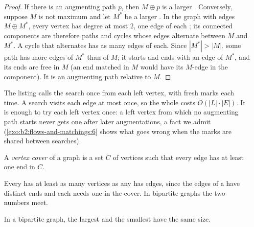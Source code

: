 \begin{proof}
If there is an augmenting path $p$, then $M \oplus p$ is a larger . Conversely, suppose $M$ is not maximum and
let $M^*$ be a larger . In the graph with edges $M \oplus M^*$, every vertex has degree at most $2$, one edge of
each ; its connected components are therefore paths and cycles whose edges alternate between $M$ and $M^*$. A
cycle that alternates has as many edges of each. Since $|M^*| > |M|$, some path has more edges of $M^*$ than of $M$;
it starts and ends with an edge of $M^*$, and its ends are free in $M$ (an end matched in $M$ would have its $M$-edge
in the component). It is an augmenting path relative to $M$.
\end{proof}

The listing calls the search once from each left vertex, with fresh marks each time. A search visits each edge at most
once, so the whole costs $O(|L| \cdot |E|)$. It is enough to try each left vertex once: a left vertex from which no
augmenting path starts never gets one after later augmentations, a fact we admit (\cref{exo:b2:flows-and-matchings:6}
shows what goes wrong when the marks are shared between searches).

\begin{definition}\label{def:b2:flows-and-matchings:vertex-cover}
A \emph{vertex cover} of a graph is a set $C$ of vertices such that every edge has at least one end
in $C$.
\end{definition}

Every  has at least as many vertices as any  has edges, since the edges of a  have
distinct ends and each needs one in the cover. In bipartite graphs the two numbers meet.

\begin{theorem}[K\H{o}nig]\label{thm:b2:flows-and-matchings:konig}
In a bipartite graph, the largest  and the smallest  have the same size.
\end{theorem}

